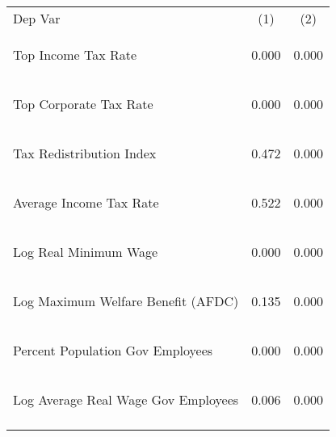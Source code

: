 \begin{center}
\begin{tabular}{lcc}
\hline \noalign{\smallskip}Dep Var & (1) & (2)\\
\noalign{\smallskip}\hline \noalign{\smallskip}Top Income Tax Rate & \begin{scriptsize}0.000\end{scriptsize} & \begin{scriptsize}0.000\end{scriptsize}\\
Top Corporate Tax Rate & \begin{scriptsize}0.000\end{scriptsize} & \begin{scriptsize}0.000\end{scriptsize}\\
Tax Redistribution Index & \begin{scriptsize}0.472\end{scriptsize} & \begin{scriptsize}0.000\end{scriptsize}\\
Average Income Tax Rate & \begin{scriptsize}0.522\end{scriptsize} & \begin{scriptsize}0.000\end{scriptsize}\\
Log Real Minimum Wage & \begin{scriptsize}0.000\end{scriptsize} & \begin{scriptsize}0.000\end{scriptsize}\\
Log Maximum Welfare Benefit (AFDC) & \begin{scriptsize}0.135\end{scriptsize} & \begin{scriptsize}0.000\end{scriptsize}\\
Percent Population Gov Employees & \begin{scriptsize}0.000\end{scriptsize} & \begin{scriptsize}0.000\end{scriptsize}\\
Log Average Real Wage Gov Employees & \begin{scriptsize}0.006\end{scriptsize} & \begin{scriptsize}0.000\end{scriptsize}\\
\noalign{\smallskip}\hline\end{tabular}\\
\end{center}
